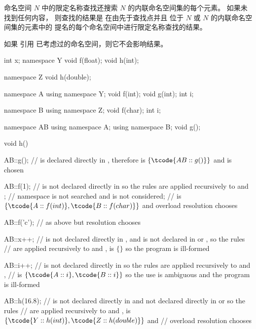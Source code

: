 \pnum
命名空间 $N$ 中的限定名称查找还搜索
$N$ 的内联命名空间集的每个元素。
如果未找到任何内容，
则查找的结果是
在由先于查找点并且
位于 $N$ 或 $N$ 的内联命名空间集的元素中的 
提名的每个命名空间中进行限定名称查找的结果。
\begin{note}
如果  引用
已考虑过的命名空间，则它不会影响结果。
\end{note}
\begin{example}
\begin{codeblock}
int x;
namespace Y {
  void f(float);
  void h(int);
}

namespace Z {
  void h(double);
}

namespace A {
  using namespace Y;
  void f(int);
  void g(int);
  int i;
}

namespace B {
  using namespace Z;
  void f(char);
  int i;
}

namespace AB {
  using namespace A;
  using namespace B;
  void g();
}

void h()
{
  AB::g();          //  is declared directly in , therefore  is $\{ \tcode{AB::g()} \}$ and  is chosen

  AB::f(1);         //  is not declared directly in  so the rules are applied recursively to  and ;
                    // namespace  is not searched and  is not considered;
                    //  is $\{ \tcode{A::f(int)}, \tcode{B::f(char)} \}$ and overload resolution chooses 

  AB::f('c');       // as above but resolution chooses 

  AB::x++;          //  is not declared directly in , and is not declared in  or , so the rules
                    // are applied recursively to  and ,  is $\{ \}$ so the program is ill-formed

  AB::i++;          //  is not declared directly in  so the rules are applied recursively to  and ,
                    //  is $\{ \tcode{A::i}, \tcode{B::i} \}$ so the use is ambiguous and the program is ill-formed

  AB::h(16.8);      //  is not declared directly in  and not declared directly in  or  so the rules
                    // are applied recursively to  and ,  is $\{ \tcode{Y::h(int)}, \tcode{Z::h(double)} \}$ and
                    // overload resolution chooses 
}
\end{codeblock}
\end{example}

